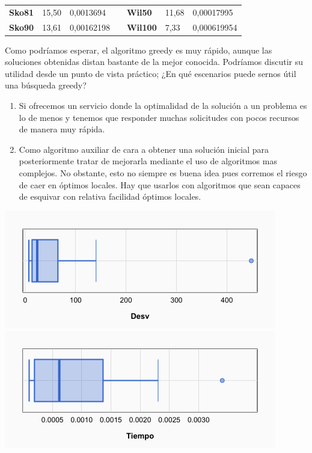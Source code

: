\documentclass[a4paper, 12pt]{article}
\begin{document}
\begin{table}[H]
\begin{tabular}{|l|l|l|l|l|l|l|}
\textbf{Sko81}   & 15,50                              & 0,0013694                            &  & \textbf{Wil50}   & 11,68                              & 0,00017995                           \\ \cline{1-3} \cline{5-7} 
\textbf{Sko90}   & 13,61                              & 0,00162198                           &  & \textbf{Wil100}  & 7,33                               & 0,000619954                          \\ \cline{1-3} \cline{5-7} 
\end{tabular}
\end{table}

      Como podríamos esperar, el algoritmo greedy es muy rápido, aunque las soluciones obtenidas distan bastante de la mejor conocida. Podríamos discutir su utilidad desde un punto de vista práctico; ¿En qué escenarios puede sernos útil una búsqueda greedy?
      
      \begin{enumerate}
         \item Si ofrecemos un servicio donde la optimalidad de la solución a un problema es lo de menos y tenemos que responder muchas solicitudes con pocos recursos de manera muy rápida.
         
         \item Como algoritmo auxiliar de cara a obtener una solución inicial para posteriormente tratar de mejorarla mediante el uso de algoritmos mas complejos. No obstante, esto no siempre es buena idea pues corremos el riesgo de caer en óptimos locales. Hay que usarlos con algoritmos que sean capaces de esquivar con relativa facilidad óptimos locales.         
      \end{enumerate}
      
      \begin{center}
         \includegraphics[scale=0.42]{boxplot-greedy-desv}
         \includegraphics[scale=0.42]{boxplot-greedy-time}
      \end{center}
      
\end{document}
